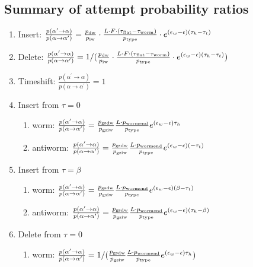 \documentclass[12pt, two sided]{article}
\begin{document}
\subsection{Summary of attempt probability ratios}
	\begin{enumerate}
	\setcounter{enumi}{0}
		\item Insert: $\frac{p(\alpha^\prime\to\alpha)}{p(\alpha\to\alpha^\prime)} = \frac{p_{\rm{dw}}}{p_{\rm{iw}}} \cdot \frac{L \cdot F \cdot (\tau_{\rm{flat}}-\tau_{\rm{worm}})}{p_{\rm{type}}} \cdot e^{(\epsilon_w-\epsilon)(\tau_h-\tau_t)}$
		\item Delete: $\frac{p(\alpha^\prime\to\alpha)}{p(\alpha\to\alpha^\prime)} = 1/(\frac{p_{\rm{dw}}}{p_{\rm{iw}}} \cdot \frac{L \cdot F \cdot (\tau_{\rm{flat}}-\tau_{\rm{worm}})}{p_{\rm{type}}} \cdot e^{(\epsilon_w-\epsilon)(\tau_h-\tau_t)})$
		\item Timeshift: $\frac{p(\alpha^\prime\to\alpha)}{p(\alpha\to\alpha^\prime)} = 1$
		\item Insert from $\tau=0$
		\begin{enumerate}
		\item{worm: $\frac{p(\alpha^\prime\to\alpha)}{p(\alpha\to\alpha^\prime)} = \frac{p_{\rm{gsdw}}}{p_{\rm{gsiw}}} \frac{L \cdot p_{\rm{wormend}}}{p_{\rm{type}}} e^{(\epsilon_w-\epsilon)\tau_h}$ }
		\item{antiworm: $\frac{p(\alpha^\prime\to\alpha)}{p(\alpha\to\alpha^\prime)} = \frac{p_{\rm{gsdw}}}{p_{\rm{gsiw}}} \frac{L \cdot p_{\rm{wormend}}}{p_{\rm{type}}} e^{(\epsilon_w-\epsilon)(-\tau_t)}$}
		\end{enumerate}
		\item Insert from $\tau=\beta$
		\begin{enumerate}
		\item{worm: $\frac{p(\alpha^\prime\to\alpha)}{p(\alpha\to\alpha^\prime)} = \frac{p_{\rm{gsdw}}}{p_{\rm{gsiw}}} \frac{L \cdot p_{\rm{wormend}}}{p_{\rm{type}}} e^{(\epsilon_w-\epsilon)(\beta-\tau_t)}$}
		\item{antiworm: $\frac{p(\alpha^\prime\to\alpha)}{p(\alpha\to\alpha^\prime)} = \frac{p_{\rm{gsdw}}}{p_{\rm{gsiw}}} \frac{L \cdot p_{\rm{wormend}}}{p_{\rm{type}}} e^{(\epsilon_w-\epsilon)(\tau_h-\beta)}$}
		\end{enumerate}
		\item Delete from $\tau=0$
		\begin{enumerate}
		\item{worm: $\frac{p(\alpha^\prime\to\alpha)}{p(\alpha\to\alpha^\prime)} = 1/(\frac{p_{\rm{gsdw}}}{p_{\rm{gsiw}}} \frac{L \cdot p_{\rm{wormend}}}{p_{\rm{type}}} e^{(\epsilon_w-\epsilon)\tau_h})$ }

\end{enumerate}
\end{enumerate}
\end{document}
